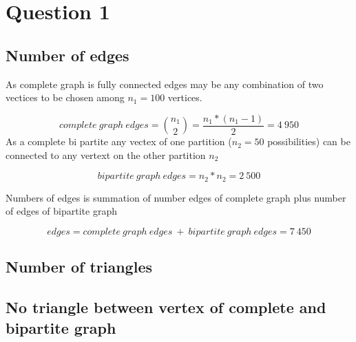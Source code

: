 \documentclass[a4paper]{article}
\begin{document}



\section{Question 1}

\subsection{Number of edges}



As complete graph is fully connected edges may be any combination of two vectices to be chosen among  $n_{1} = 100$ vertices.

\begin{equation}
complete\ graph\ edges= \binom{n_{1}}{2} = \frac{n_{1}*(n_{1} - 1)}{2}= 4\ 950
\end{equation}
As a complete bi partite any vectex of one partition ($n_{2}=50$ possibilities) can be connected to any vertext on the other partition $n_{2}$

\begin{equation}
bipartite\ graph\ edges= n_{2} * n_{2} = 2\ 500
\end{equation} 

Numbers of edges is summation of number edges of complete graph plus number of edges of bipartite graph

\begin{equation}
edges = complete\ graph\ edges\ +\ bipartite\ graph\ edges = \boxed{7\ 450} 
\end{equation}
\subsection{Number of triangles}

\subsection{No triangle between vertex of complete and bipartite graph}
\end{document}
